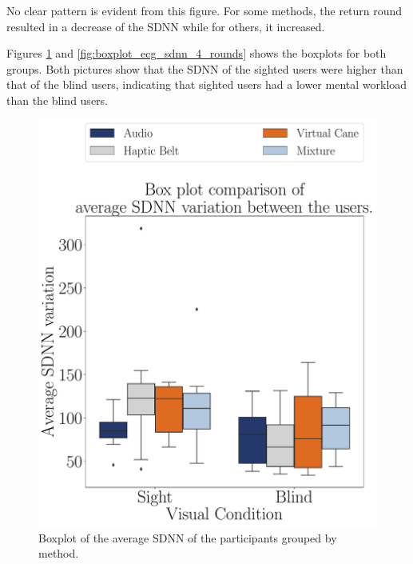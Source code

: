 No clear pattern is evident from this figure. For some methods, the return round resulted in a decrease of the SDNN while for others, it increased. 

Figures \ref{fig:boxplot_ecg_sdnn_4_scene} and \ref{fig:boxplot_ecg_sdnn_4_rounds} shows the boxplots for both groups. Both pictures show that the SDNN of the sighted users were higher than that of the blind users, indicating that sighted users had a lower mental workload than the blind users.

\begin{figure}[!htb]
    \centering
    \begin{minipage}{0.45\textwidth}
        \centering
        \includegraphics[width = \textwidth]{Resultados/ECG/Figuras/pdf/boxplot_ecg_sdnn_4_scene.pdf}
        \caption{Boxplot of the average SDNN of the participants grouped by method.}
        \label{fig:boxplot_ecg_sdnn_4_scene}
    \end{minipage}
    \begin{minipage}{0.075\textwidth}
        \hfill
    \end{minipage}
    \begin{minipage}{0.45\textwidth}

\end{minipage}
\end{figure}
